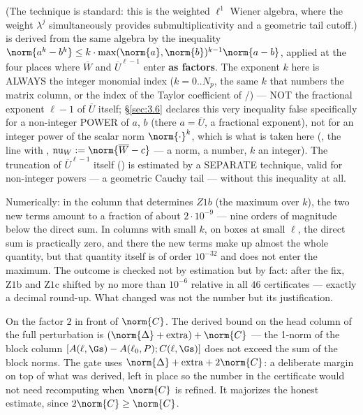 (The technique is standard: this is the weighted $\ell^{1}$ Wiener algebra,
where the weight $\lambda^{j}$ simultaneously provides submultiplicativity
and a geometric tail cutoff.)
 is derived from the same algebra by the inequality
$\norm{a^{k} - b^{k}} \le k\cdot \max(\norm{a},\norm{b})^{k-1}\norm{a-b}$,
applied at the four places where $\overline{W}$ and
$\overline{U}^{\ell-1}$ enter  \textbf{as factors}. The exponent
$k$ here is ALWAYS the integer monomial index ($k = 0..N_{p}$, the same
$k$ that numbers the matrix column, or the index of the Taylor coefficient
of /) --- NOT the fractional exponent $\ell-1$ of
$\overline{U}$ itself; \S\ref{sec:3.6} declares this very inequality false
specifically for a non-integer POWER of $a$, $b$ (there $a = \overline{U}$,
a fractional exponent), not for an integer power of the scalar norm
$\norm{\cdot}^{k}$, which is what is taken here
(, the line with ,
$\mathrm{nu}_{W} := \norm{\overline{W}-c}$ --- a norm, a number, $k$ an
integer). The truncation of $\overline{U}^{\ell-1}$ itself
() is estimated by a SEPARATE technique, valid for
non-integer powers --- a geometric Cauchy tail --- without this inequality
at all.

Numerically: in the column that determines $Z1b$ (the maximum over $k$),
the two new terms amount to a fraction of about $2\cdot 10^{-9}$ --- nine
orders of magnitude below the direct sum. In columns with small $k$, on
boxes at small $\ell$, the direct sum is practically zero, and there the
new terms make up almost the whole quantity, but that quantity itself is of
order $10^{-32}$ and does not enter the maximum. The outcome is checked not
by estimation but by fact: after the fix, $\mathrm{Z1b}$ and $\mathrm{Z1c}$
shifted by no more than $10^{-6}$ relative in all $46$ certificates ---
exactly a decimal round-up. What changed was not the number but its
justification.

On the factor $2$ in front of $\norm{C}$. The derived bound on the head
column of the full perturbation is $(\norm{\Delta} + \mathrm{extra}) +
\norm{C}$ --- the 1-norm of the block column
$[A(\ell,\Gs) - A(\ell_{0},P) ; C(\ell,\Gs)]$ does not exceed the sum of
the block norms. The gate uses
$\norm{\Delta} + \mathrm{extra} + 2\norm{C}$: a deliberate margin on top
of what was derived, left in place so the number in the certificate would
not need recomputing when $\norm{C}$ is refined. It majorizes the honest
estimate, since $2\norm{C} \ge \norm{C}$.

